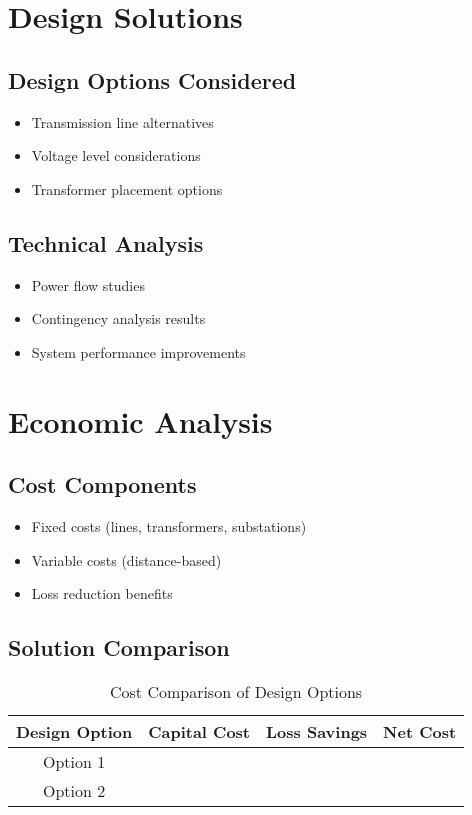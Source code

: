 \documentclass[conference]{IEEEtran}
\begin{document}
	\section{Design Solutions}
	\subsection{Design Options Considered}
	\begin{itemize}
		\item Transmission line alternatives
		\item Voltage level considerations
		\item Transformer placement options
	\end{itemize}
	
	\subsection{Technical Analysis}
	\begin{itemize}
		\item Power flow studies
		\item Contingency analysis results
		\item System performance improvements
	\end{itemize}
	
	\section{Economic Analysis}
	\subsection{Cost Components}
	\begin{itemize}
		\item Fixed costs (lines, transformers, substations)
		\item Variable costs (distance-based)
		\item Loss reduction benefits
	\end{itemize}
	
	\subsection{Solution Comparison}
	\begin{table}[htbp]
		\caption{Cost Comparison of Design Options}
		\begin{center}
			\begin{tabular}{|c|c|c|c|}
				\hline
				\textbf{Design Option} & \textbf{Capital Cost} & \textbf{Loss Savings} & \textbf{Net Cost} \\
				\hline
				Option 1 & & & \\
				\hline
				Option 2 & & & \\
				\hline
			\end{tabular}
			\label{tab:costs}
		\end{center}
	\end{table}
	
\end{document}
